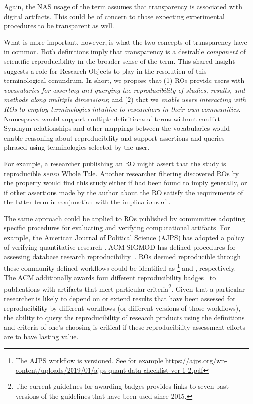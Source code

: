 \noindent Again, the NAS usage of the term assumes that transparency is associated with digital artifacts.
This could be of concern to those expecting experimental procedures to be transparent as well.

What is more important, however, is what the two concepts of transparency have in common.
Both definitions imply that transparency is a desirable \emph{component} of scientific
    reproducibility in the broader sense of the term.
This shared insight suggests a role for Research Objects to play in the resolution of this
    terminological conundrum.
In short, we propose that (1) ROs provide users with \emph{vocabularies for asserting and
    querying the reproducibility of studies, results, and methods along multiple dimensions};
    and (2) that we \emph{enable users interacting with ROs to employ terminologies intuitive to
    researchers in their own communities}.
Namespaces would support multiple definitions of terms without conflict.
Synonym relationships and other mappings between the vocabularies would enable reasoning about
    reproducibility and support assertions and queries phrased using terminologies selected by
    the user.

    For example, a researcher publishing an RO might assert that the
    study is reproducible \emph{sensu} Whole Tale.  Another researcher
    filtering discovered ROs by the property 
    would find this study either if  had been
    found to imply  generally, or if other
    assertions made by the author about the RO satisfy the
    requirements of the latter term in conjunction with the
    implications of .

The same approach could be applied to ROs published by communities adopting specific
    procedures for evaluating and verifying computational artifacts.
For example, the American Journal of Political Science (AJPS) has adopted a policy of
    verifying quantitative research \cite{christian2018}.
ACM SIGMOD has defined procedures for assessing database research
    reproducibility~\cite{bonnet_repeatability_2011, sigmod2018reproducibility}.
ROs deemed reproducible through these community-defined workflows could be
    identified as \footnote{
        The AJPS workflow is versioned. See for example
        \url{https://ajps.org/wp-content/uploads/2019/01/ajps-quant-data-checklist-ver-1-2.pdf}
    } and , respectively.
The ACM additionally awards four different reproducibility badges~\cite{acm2018artifact} to publications
    with artifacts that meet particular criteria\footnote{The current guidelines for awarding
    badges provides links to seven past versions of the guidelines that have been used since 2015.}.
Given that a particular researcher is likely to depend on or extend results that have been
    assessed for reproducibility by different workflows (or different versions of those
    workflows), the ability to query the reproducibility of research products using the definitions and
    criteria of one's choosing is critical if these reproducibility assessment efforts
    are to have lasting value.

